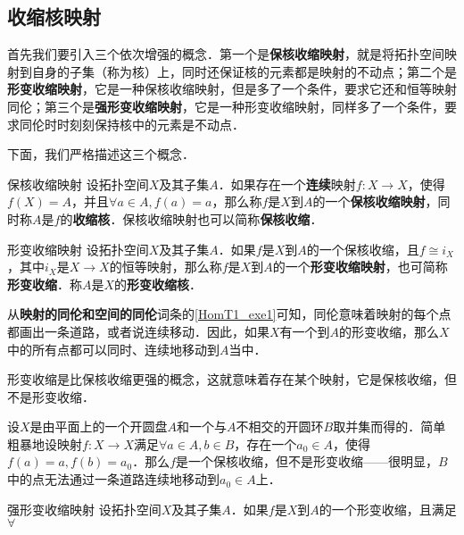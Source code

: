 \subsection{收缩核映射}

首先我们要引入三个依次增强的概念．第一个是\textbf{保核收缩映射}，就是将拓扑空间映射到自身的子集（称为核）上，同时还保证核的元素都是映射的不动点；第二个是\textbf{形变收缩映射}，它是一种保核收缩映射，但是多了一个条件，要求它还和恒等映射同伦；第三个是\textbf{强形变收缩映射}，它是一种形变收缩映射，同样多了一个条件，要求同伦时时刻刻保持核中的元素是不动点．

下面，我们严格描述这三个概念．

\begin{definition}{保核收缩映射}
设拓扑空间$X$及其子集$A$．如果存在一个\textbf{连续}映射$f:X\rightarrow X$，使得$f(X)=A$，并且$\forall a\in A, f(a)=a$，那么称$f$是$X$到$A$的一个\textbf{保核收缩映射}，同时称$A$是$f$的\textbf{收缩核}．保核收缩映射也可以简称\textbf{保核收缩}．
\end{definition}

\begin{definition}{形变收缩映射}
设拓扑空间$X$及其子集$A$．如果$f$是$X$到$A$的一个保核收缩，且$f\cong i_X$，其中$i_X$是$X\rightarrow X$的恒等映射，那么称$f$是$X$到$A$的一个\textbf{形变收缩映射}，也可简称\textbf{形变收缩}．称$A$是$X$的\textbf{形变收缩核}．
\end{definition}

从\textbf{映射的同伦和空间的同伦}词条的\autoref{HomT1_exe1}可知，同伦意味着映射的每个点都画出一条道路，或者说连续移动．因此，如果$X$有一个到$A$的形变收缩，那么$X$中的所有点都可以同时、连续地移动到$A$当中．

形变收缩是比保核收缩更强的概念，这就意味着存在某个映射，它是保核收缩，但不是形变收缩．

\begin{example}{}
设$X$是由平面上的一个开圆盘$A$和一个与$A$不相交的开圆环$B$取并集而得的．简单粗暴地设映射$f:X\rightarrow X$满足$\forall a\in A, b\in B$，存在一个$a_0\in A$，使得$f(a)=a, f(b)=a_0$．那么$f$是一个保核收缩，但不是形变收缩——很明显，$B$中的点无法通过一条道路连续地移动到$a_0\in A$上．
\end{example}

\begin{definition}{强形变收缩映射}
设拓扑空间$X$及其子集$A$．如果$f$是$X$到$A$的一个形变收缩，且满足$\forall$
\end{definition}


